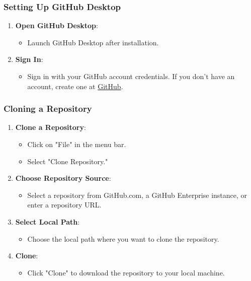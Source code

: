 \subsubsection{Setting Up GitHub Desktop}

\begin{enumerate}
    \item \textbf{Open GitHub Desktop}:
    \begin{itemize}
        \item Launch GitHub Desktop after installation.
    \end{itemize}

    \item \textbf{Sign In}:
    \begin{itemize}
        \item Sign in with your GitHub account credentials. If you don’t have an account, create one at \href{https://github.com/join}{GitHub}.
    \end{itemize}
\end{enumerate}

\subsubsection{Cloning a Repository}

\begin{enumerate}
    \item \textbf{Clone a Repository}:
    \begin{itemize}
        \item Click on "File" in the menu bar.
        \item Select "Clone Repository."
    \end{itemize}

    \item \textbf{Choose Repository Source}:
    \begin{itemize}
        \item Select a repository from GitHub.com, a GitHub Enterprise instance, or enter a repository URL.
    \end{itemize}

    \item \textbf{Select Local Path}:
    \begin{itemize}
        \item Choose the local path where you want to clone the repository.
    \end{itemize}

    \item \textbf{Clone}:
    \begin{itemize}
        \item Click "Clone" to download the repository to your local machine.
    \end{itemize}
\end{enumerate}

